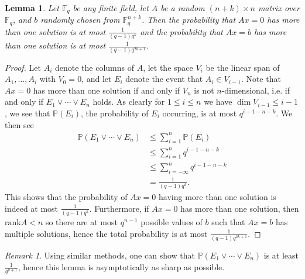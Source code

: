 \documentclass[12pt]{article}
\renewcommand{\P}{\mathbb{P}}
\newcommand{\F}{\mathbb{F}}
\theoremstyle{plain}
\newtheorem{lem}[thm]{Lemma} %
\theoremstyle{definition}
\theoremstyle{remark}
\newtheorem{rem}[thm]{Remark} %
\begin{document}
\begin{lem}
\label{lem:probindep}
Let $\F_q$ be any finite field, let $A$ be a random $(n+k)\times n$ matrix over $\F_q$, and $b$ randomly chosen from $\F_q^{n+k}$. Then the probability that $Ax=0$ has more than one solution is at most $\frac{1}{(q-1)q^k}$ and the probability that $Ax=b$ has more than one solution is at most $\frac{1}{(q-1)q^{2k+1}}$.
\end{lem}
\begin{proof}
Let $A_i$ denote the columns of $A$, let the space $V_i$ be the linear span of $A_1,\dots,A_i$ with $V_0 = 0$, and let $E_i$ denote the event that $A_i \in V_{i-1}$. Note that $Ax = 0$ has more than one solution if and only if $V_n$ is not $n$-dimensional, i.e. if and only if $E_1 \vee \cdots \vee E_n$ holds. As clearly for $1\leq i \leq n$ we have $\dim V_{i-1} \leq i-1$, we see that $\P(E_i)$, the probability of $E_i$ occurring,  is at most $q^{i-1-n-k}$. We then see
\begin{align*}
\P(E_1 \vee \cdots \vee E_n) &\leq \sum_{i=1}^n \P(E_i)\\
&\leq \sum_{i=1}^n q^{i-1-n-k}\\
&\leq \sum_{i=-\infty}^n q^{i-1-n-k}\\
&= \frac{1}{(q-1)q^k}.
\end{align*}
This shows that the probability of $Ax = 0$ having more than one solution is indeed at most $\frac{1}{(q-1)q^k}$. Furthermore, if $Ax = 0$ has more than one solution, then $\text{rank} A < n$ so there are at most $q^{n-1}$ possible values of $b$ such that $Ax = b$ has multiple solutions, hence the total probability is at most $\frac{1}{(q-1)q^{2k+1}}$.
\end{proof}
\begin{rem}
Using similar methods, one can show that $\P(E_1 \vee \cdots \vee E_n)$ is at least $\frac{1}{q^{k+1}}$, hence this lemma is asymptotically as sharp as possible.
\end{rem}
\end{document}
